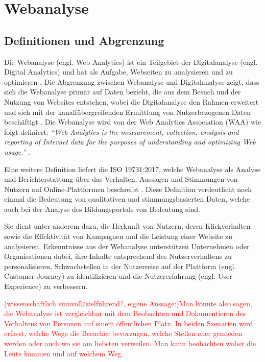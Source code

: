 \chapter{Webanalyse} %
\label{ch:webanalyse} 

\section{Definitionen und Abgrenzung} %
Die Webanalyse (engl. Web Analytics) ist ein Teilgebiet der Digitalanalyse (engl. Digital Analytics) und hat als Aufgabe, Webseiten zu analysieren und zu optimieren \parencite[Kap.1.2]{Hassler2019}. Die Abgrenzung zwischen Webanalyse und Digitalanalyse zeigt, dass sich die Webanalyse primär auf Daten bezieht, die aus dem Besuch und der Nutzung von Websites entstehen, wobei die Digitalanalyse den Rahmen erweitert und sich mit der kanalfübergreifenden Ermittlung von Nutzerbezogenen Daten beschäftigt \parencite[Kap.1.2]{Hassler2019}. Die Webanalyse wird von der Web Analytics Association (WAA) wie folgt definiert: \textit{``Web Analytics is the measurement, collection, analysis and reporting of Internet data for the purposes of understanding and optimizing Web usage.''} \parencite[3]{WAA2008}.

Eine weitere Definition liefert die ISO 19731:2017, welche Webanalyse als Analyse und Berichterstattung über das Verhalten, Aussagen und Stimmungen von Nutzern auf Online-Plattformen beschreibt \parencite[Kap.3.40]{ISO2017}. Diese Definition verdeutlicht noch einmal die Bedeutung von qualitativen und stimmungsbasierten Daten, welche auch bei der Analyse des Bildungsportals von Bedeutung sind.

Sie dient unter anderem dazu, die Herkunft von Nutzern, deren Klickverhalten sowie die Effektivität von Kampagnen und die Leistung einer Website zu analysieren. Erkenntnisse aus der Webanalyse unterstützen Unternehmen oder Organisationen dabei, ihre Inhalte entsprechend des Nutzerverhaltens zu personalisieren, Schwachstellen in der Nutzerreise auf der Plattform (engl. Customer Journey) zu identifizieren und die Nutzererfahrung (engl. User Experience) zu verbessern. \parencite[o. D]{PiwikProWebanalyse}

\textcolor{red}{
    (wissenschaftlich sinnvoll/zielführend?, eigene Aussage:)Man könnte also sagen, die Webanalyse ist vergleichbar mit dem Beobachten und Dokumentieren des Verhaltens von Personen auf einem öffentlichen Platz. In beiden Szenarien wird erfasst, welche Wege die Besucher bevorzugen, welche Stellen eher gemieden werden oder auch wo sie am liebsten verweilen. Man kann beobachten woher die Leute kommen und auf welchem Weg.
}

